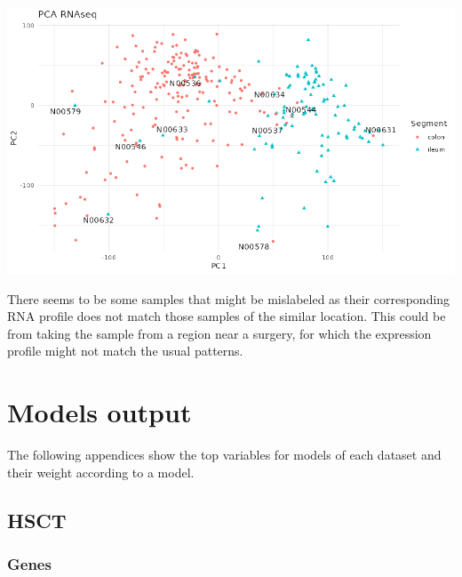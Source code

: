 \documentclass[
  12pt,
  a4paper,
  twoside,
  openright]{book}
\let\origfigure\figure
\let\endorigfigure\endfigure
\renewenvironment{figure}[1][2] {
    \expandafter\origfigure\expandafter[!htbp]
} {
    \endorigfigure
}
\begin{document}
\begin{figure}
\includegraphics[width=1\linewidth]{images/hernandez_PCA_RNAseq} \caption[PCA of RNAseq of the Hernandez's dataset]{PCA of RNAseq of the Hernandez's dataset. The plot shows a clear separation between colon and ileum for most samples except for some that seem mislabeled.}\label{fig:unnamed-chunk-5}
\end{figure}

There seems to be some samples that might be mislabeled as their corresponding RNA profile does not match those samples of the similar location.
This could be from taking the sample from a region near a surgery, for which the expression profile might not match the usual patterns.

\hypertarget{models-output}{%
\chapter{Models output}\label{models-output}}

The following appendices show the top variables for models of each dataset and their weight according to a model.

\hypertarget{hsct}{%
\section{HSCT}\label{hsct}}

\hypertarget{genes}{%
\subsection{Genes}\label{genes}}
\end{document}
